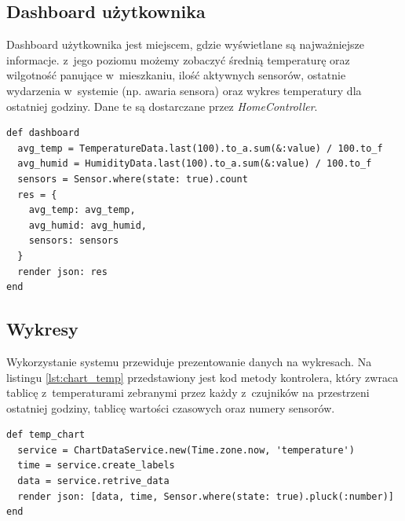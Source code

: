 \documentclass[eng,oneside]{mgr}
\begin{document}
\subsection{Dashboard użytkownika} %
\label{sub:dashboard_uzytkownika}
Dashboard użytkownika jest miejscem, gdzie wyświetlane są najważniejsze informacje. z~jego poziomu możemy zobaczyć średnią temperaturę oraz wilgotność panujące w~mieszkaniu, ilość aktywnych sensorów, ostatnie wydarzenia w~systemie (np. awaria sensora) oraz wykres temperatury dla ostatniej godziny. Dane te są dostarczane przez \emph{HomeController}.
\begin{lstlisting}[caption={Metoda dashboard odpowiedzialna za generowanie danych dla dashboardu.},label=lst:dashboard]
def dashboard
  avg_temp = TemperatureData.last(100).to_a.sum(&:value) / 100.to_f
  avg_humid = HumidityData.last(100).to_a.sum(&:value) / 100.to_f
  sensors = Sensor.where(state: true).count
  res = {
    avg_temp: avg_temp,
    avg_humid: avg_humid,
    sensors: sensors
  }
  render json: res
end  
\end{lstlisting}

\subsection{Wykresy} %
\label{sub:wykresy}
Wykorzystanie systemu przewiduje prezentowanie danych na wykresach. Na listingu \ref{lst:chart_temp} przedstawiony jest kod metody kontrolera, który zwraca tablicę z~temperaturami zebranymi przez każdy z~czujników na przestrzeni ostatniej godziny, tablicę wartości czasowych oraz numery sensorów.
\begin{lstlisting}[caption={Metoda odpowiedzialna za generowanie danych dla wykresów.},label=lst:chart_temp]
def temp_chart
  service = ChartDataService.new(Time.zone.now, 'temperature')
  time = service.create_labels
  data = service.retrive_data
  render json: [data, time, Sensor.where(state: true).pluck(:number)]
end
\end{lstlisting}
\end{document}
